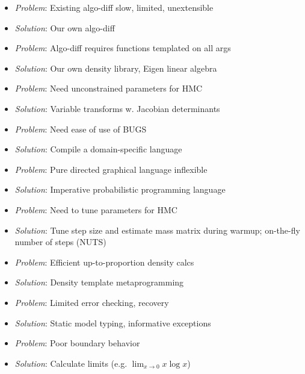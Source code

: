 \documentclass[10pt]{report}
\newcommand{\sld}[1]{\newpage{\noindent\LARGE \ \ \
    \textcolor{MidnightBlue}{\bfseries #1}}\vspace*{4pt}}
\begin{document}
\sld{Why? (cont.)}
%
\begin{itemize}
\item {\slshape Problem}:  Existing algo-diff slow, limited, unextensible
\item {\slshape Solution}: Our own algo-diff
%
\vspace*{8pt}
\item {\slshape Problem}:  Algo-diff requires functions templated on
  all args
\item {\slshape Solution}: Our own density library, Eigen linear
 algebra
%
\vspace*{8pt}
\item {\slshape Problem}:  Need unconstrained parameters for HMC
\item {\slshape Solution}: Variable transforms w. Jacobian determinants
%
\end{itemize}

\sld{Why? (cont.)}
%
\begin{itemize}
\item {\slshape Problem}:  Need ease of use of BUGS
\item {\slshape Solution}: Compile a domain-specific language
%
\vspace*{8pt}
\item {\slshape Problem}:  Pure directed graphical language inflexible
\item {\slshape Solution}: Imperative probabilistic programming language

\vspace*{8pt}
\item {\slshape Problem}:  Need to tune parameters for HMC
\item {\slshape Solution}: Tune step size and estimate mass matrix
  during warmup;  on-the-fly number of steps (NUTS)
%
\end{itemize}

\sld{Why? (cont.)}
\begin{itemize}
%
\vspace*{8pt}
\item {\slshape Problem}:  Efficient up-to-proportion density calcs
\item {\slshape Solution}: Density template metaprogramming 
%
\vspace*{8pt}
\item {\slshape Problem}:  Limited error checking, recovery
\item {\slshape Solution}: Static model typing, informative exceptions
%
\vspace*{8pt}
\item {\slshape Problem}:  Poor boundary behavior
\item {\slshape Solution}: Calculate limits (e.g. $\lim_{x \rightarrow
    0} x \log x$)
%
\end{itemize}
\end{document}
